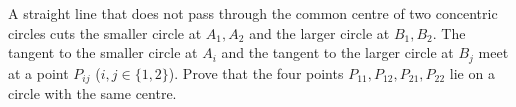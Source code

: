 A straight line that does not pass through the common centre of two concentric circles cuts the smaller circle at $A_1,A_2$ and the larger circle at $B_1,B_2$. The tangent to the smaller circle at $A_i$ and the tangent to the larger circle at $B_j$ meet at a point $P_{ij}$ ($i,j\in\{1,2\}$). Prove that the four points $P_{11},P_{12},P_{21},P_{22}$ lie on a circle with the same centre.
